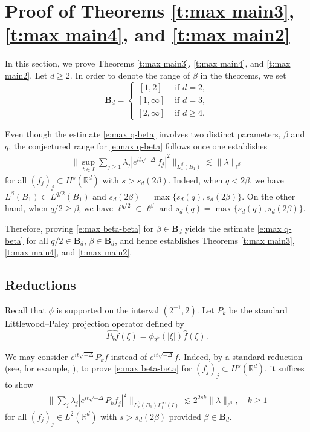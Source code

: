 \documentclass[a4paper]{amsart}
\numberwithin{figure}{section}
\numberwithin{equation}{section}%
\theoremstyle{plain}%
\theoremstyle{definition}
\theoremstyle{remark}%
\newcommand{\R}{{\mathbb R}}
\begin{document}
\section{Proof of Theorems \ref{t:max main3}, \ref{t:max main4}, and \ref{t:max main2}}\label{sec:4}

In this section, we prove Theorems \ref{t:max main3}, \ref{t:max main4}, and \ref{t:max main2}.  Let $d\ge 2.$  In order to denote the range of 
$\beta$ in the theorems, we set 
\[
\mathbf B_d= 
\begin{cases}     
 \, [1,2]       & \text{ if } d=2, 
 \\
[1,\infty]  &   \text{ if }  d=3,
\\
[2,\infty]  & \text{ if }  d\ge4. 
\end{cases} 
\]



Even though the estimate \eqref{e:max q-beta} involves two distinct parameters, $\beta$ and $q$,
the conjectured range for \eqref{e:max q-beta} follows once one establishes 
\begin{align}\label{e:max beta-beta}
\Big\|\sup_{t\in I}\sum_{j\geq1} \lambda_j|e^{it\sqrt{-\Delta}}f_j|^2 \Big\|_{L_x^\beta(B_1)}
\lesssim 
\|\lambda\|_{\ell^\beta}
\end{align}
for all $(f_j)_j \subset H^s(\R^d)$ with $s > s_d(2\beta)$. Indeed, when $q < 2\beta$, we have $L^\beta(B_1) \subset L^{q/2}(B_1)$ and $s_d(2\beta) = \max\{s_d(q), s_d(2\beta)\}$. On the other hand, when $q/2 \geq \beta$, we have $\ell^{q/2} \subset \ell^\beta$ and $s_d(q) = \max\{s_d(q), s_d(2\beta)\}$.

Therefore, proving \eqref{e:max beta-beta} for $\beta \in \mathbf B_d$ yields  the estimate \eqref{e:max q-beta} for all $q/2 \in \mathbf B_d$, $\beta \in \mathbf B_d$, and hence establishes Theorems \ref{t:max main3}, \ref{t:max main4}, and \ref{t:max main2}.

\subsection{Reductions}\label{s:3-1}
Recall that $\phi$ is supported on the interval $(2^{-1}, 2)$. Let $P_k$ be the standard Littlewood--Paley projection operator defined by  
\[ \widehat{P_kf}(\xi) =\phi_{2^k}(|\xi|)\widehat f(\xi).\]  

We may consider $e^{it\sqrt{-\Delta}}P_kf$ instead of $e^{it\sqrt{-\Delta}}f$.  Indeed,  by a standard  reduction (see, for example, \cite{KKS}), to prove \eqref{e:max beta-beta} for $(f_j)_j \subset H^s(\R^d)$,  it suffices to show 
\begin{align}\label{e:max q-beta2}
\Big\|\sum_j \lambda_j|e^{it\sqrt{-\Delta}}P_kf_j|^2 \Big\|_{L_x^\beta(B_1) L_t^\infty(I)}
\lesssim 
2^{2sk}\|\lambda\|_{\ell^\beta}, \quad k\ge 1 
\end{align}
for all $(f_j)_j \in L^2(\R^d)$ with $s>s_d(2\beta)$ provided $\beta \in \mathbf B_d$.
\end{document}
